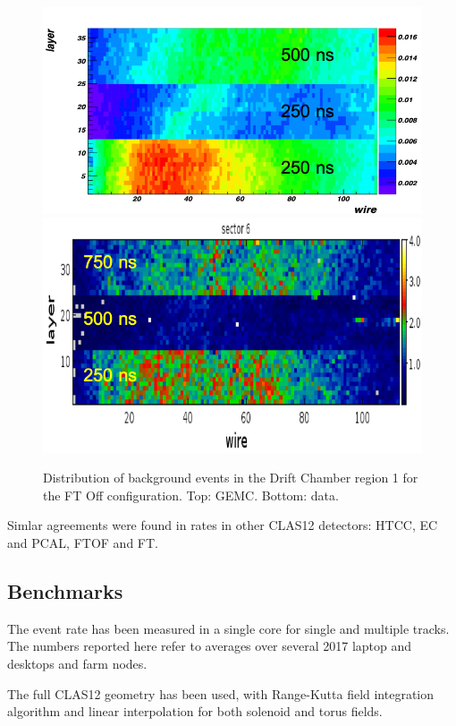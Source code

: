 \begin{figure}
	\centering
	\includegraphics[width=0.95\columnwidth,keepaspectratio]{img/ftOffGemcDCRates.png}
	\includegraphics[width=0.95\columnwidth,keepaspectratio]{img/ftOffDataDCRates.png}
	\caption{Distribution of background events in the Drift Chamber region 1 for the FT Off configuration.
             Top: GEMC. Bottom: data.}
	\label{fig:ftOffComparison}
\end{figure}

Simlar agreements were found in rates in other CLAS12 detectors: HTCC, EC and PCAL, FTOF and FT.

\subsection{Benchmarks}

The event rate has been measured in a single core for single and multiple tracks. The numbers reported here
refer to averages over several 2017 laptop and desktops and farm nodes.

The full CLAS12 geometry has been used, with Range-Kutta field integration algorithm
and linear interpolation for both solenoid and torus fields.

